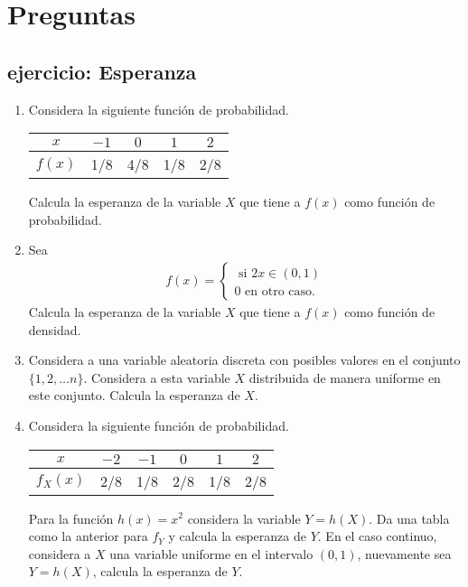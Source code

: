 \documentclass{assignment}
\begin{document}
\maketitle


\section{Preguntas}
\subsection{ejercicio: Esperanza}

\begin{enumerate}
	\item Considera la siguiente función de probabilidad.
\begin{center}
	\begin{tabular}{ |c|c|c|c|c| } 
 	\hline
 $x$ & $-1$ & $0$ & $1$ & $2$ \\ 
	 \hline
 $f(x)$      & 1/8 & 4/8 & 1/8 & 2/8 \\
 	\hline
	\end{tabular}
\end{center}
	Calcula la esperanza de la variable $X$ que tiene a  $f(x)$ como función de probabilidad. 

	
	\item Sea 
	\begin{align*}
	f(x)= \begin{cases} \text{ si } 2x \in (0,1) \\
		0 \text{ en otro caso.}
		\end{cases}
	\end{align*}
Calcula la esperanza de la variable $X$ que tiene a $f(x)$ como función de densidad.

	\item Considera a una variable aleatoria discreta con posibles valores en el conjunto $\{1,2, \dots n\}.$ Considera a esta variable $X$ distribuida de manera uniforme en este conjunto. Calcula la esperanza de $X$. 
	
	\item Considera la siguiente función de probabilidad.
\begin{center}
	\begin{tabular}{ |c|c|c|c|c|c| } 
 	\hline
 $x$ & $-2$ & $-1$ & $0$ & $1$ & $2$ \\ 
	 \hline
 $f_X(x)$ & 2/8 & 1/8 & 2/8 & 1/8  & 2/8 \\
 	\hline
	\end{tabular}
\end{center}		
	Para la función $h(x)= x^2$ considera la variable $Y=h(X)$. Da una tabla como la anterior para $f_Y$ y calcula la esperanza de $Y$. En el caso continuo, considera a $X$ una variable uniforme en el intervalo $(0,1)$, nuevamente sea $Y=h(X)$, calcula la esperanza de $Y.$
	 

	
\end{enumerate}
\end{document}
